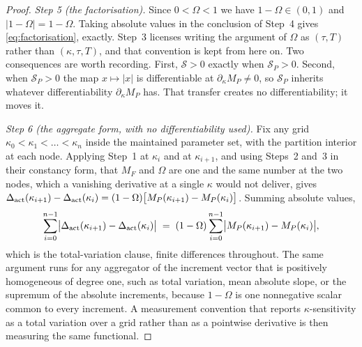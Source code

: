 \begin{proof}
\emph{Step 5 (the factorisation).} Since $0 < \Omega < 1$ we have $1 - \Omega \in (0,1)$ and
$|1 - \Omega| = 1 - \Omega$. Taking absolute values in the conclusion of Step~4 gives
\eqref{eq:factorisation}, exactly. Step~3 licenses writing the argument of $\Omega$ as $(\tau,T)$
rather than $(\kappa,\tau,T)$, and that convention is kept from here on. Two consequences are worth
recording. First, $\mathcal S > 0$ exactly when $\mathcal S_P > 0$. Second, when $\mathcal S_P > 0$
the map $x \mapsto |x|$ is differentiable at $\partial_\kappa M_P \ne 0$, so $\mathcal S_P$ inherits
whatever differentiability $\partial_\kappa M_P$ has. That transfer creates
no differentiability; it moves it.

\emph{Step 6 (the aggregate form, with no differentiability used).} Fix any grid
$\kappa_0 < \kappa_1 < \dots < \kappa_n$ inside the maintained parameter set, with the partition
interior at each node. Applying Step~1 at $\kappa_i$ and at $\kappa_{i+1}$, and using Steps~2 and~3
in their constancy form, that $M_F$ and $\Omega$ are one and the same number at the two nodes, which
a vanishing derivative at a single $\kappa$ would not deliver, gives
$\Delta_{\mathrm{act}}(\kappa_{i+1}) - \Delta_{\mathrm{act}}(\kappa_i) = (1 - \Omega)\bigl[M_P(\kappa_{i+1}) - M_P(\kappa_i)\bigr]$.
Summing absolute values,
\begin{equation}
\label{eq:tv-form}
  \sum_{i=0}^{n-1}\bigl\lvert \Delta_{\mathrm{act}}(\kappa_{i+1}) - \Delta_{\mathrm{act}}(\kappa_i)\bigr\rvert
  \;=\; (1 - \Omega)\sum_{i=0}^{n-1}\bigl\lvert M_P(\kappa_{i+1}) - M_P(\kappa_i)\bigr\rvert,
\end{equation}
which is the total-variation clause, finite differences throughout. The same argument runs for any
aggregator of the increment vector that is positively homogeneous of degree one, such as total
variation, mean absolute slope, or the supremum of the absolute increments, because $1 - \Omega$ is
one nonnegative scalar common to every increment. A measurement convention that reports
$\kappa$-sensitivity as a total variation over a grid rather than as a pointwise derivative is then
measuring the same functional.
\end{proof}


\providecommand{\Prb}{\mathbb{P}}
\providecommand{\ind}{\mathbf{1}}

